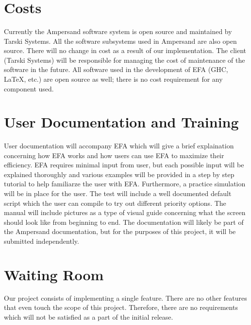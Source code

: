 \documentclass[12pt]{report}
\begin{document}
\section{Costs}\label{sec:Costs}
\paragraph*{}
Currently the Ampersand software system is open source and maintained by Tarski
Systems.  All the software subsystems used in Ampersand are also open
source. There will no change in cost as a result of our implementation. The
client (Tarski Systems) will be responsible for managing the cost of
maintenance of the software in the future. All software used in the development
of EFA (GHC, LaTeX, etc.) are open source as well; there is no cost
requirement for any component used.
\section{User Documentation and Training}\label{sec:UserDoc}
\paragraph*{}
 User documentation will accompany EFA which will give a brief explaination concerning 
how EFA works and how users can use EFA to maximize their efficiency. EFA requires minimal 
input from user, but each possible input will be explained thoroughly and various examples will be 
provided in a step by step tutorial to help familiarze the user with EFA. Furthermore, a 
practice simulation will be in place for the user. The test will include a well documented default 
script which the user can compile to try out different priority options. The manual will include 
pictures as a type of visual guide concerning what the screen should look like from beginning to 
end. The documentation will likely be part of the Ampersand documentation, but for the purposes of 
this project, it will be submitted independently. 

\section{Waiting Room}\label{sec:Waiting}
Our project consists of implementing a single feature. There are no other
features that even touch the scope of this project. Therefore, there are no
requirements which will not be satisfied as a part of the initial release.




\end{document}
